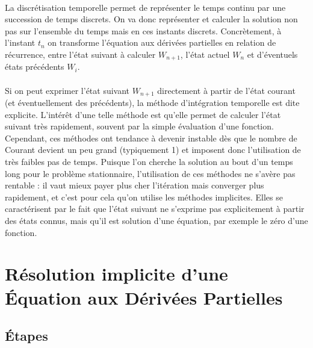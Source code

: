 		\paragraph{} La discrétisation temporelle permet de représenter le temps continu par une succession de temps discrets.
		On va donc représenter et calculer la solution non pas sur l'ensemble du temps mais en ces instants discrets.
		Concrètement, à l'instant $t_n$ on transforme l'équation aux dérivées partielles en relation de récurrence, entre l'état suivant à calculer $W_{n+1}$, l'état actuel $W_n$ et d'éventuels états précédents $W_i$.

		\paragraph{} Si on peut exprimer l'état suivant $W_{n+1}$ directement à partir de l'état courant (et éventuellement des précédents), la méthode d'intégration temporelle est dite explicite.
		L'intérêt d'une telle méthode est qu'elle permet de calculer l'état suivant très rapidement, souvent par la simple évaluation d'une fonction.
		Cependant, ces méthodes ont tendance à devenir instable dès que le nombre de Courant devient un peu grand (typiquement 1) et imposent donc l'utilisation de très faibles pas de temps.
		Puisque l'on cherche la solution au bout d'un temps long pour le problème stationnaire, l'utilisation de ces méthodes ne s'avère pas rentable : il vaut mieux payer plus cher l'itération mais converger plus rapidement, et c'est pour cela qu'on utilise les méthodes implicites.
		Elles se caractérisent par le fait que l'état suivant ne s'exprime pas explicitement à partir des états connus, mais qu'il est solution d'une équation, par exemple le zéro d'une fonction.



\section{Résolution implicite d'une Équation aux Dérivées Partielles}

	\subsection{Étapes}

